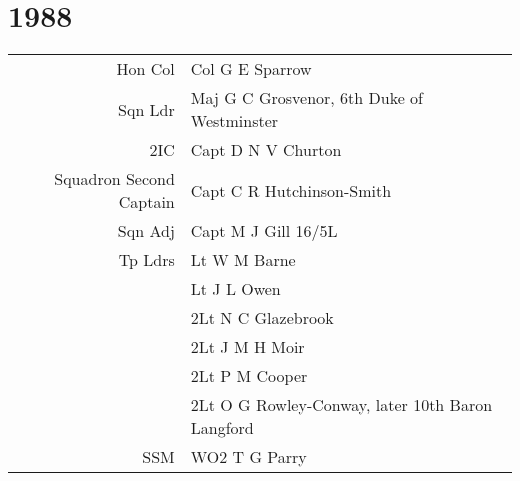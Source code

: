 \chapter*{1988}

\begin{center}
  \small
  \begin{tabular}{rl}
    Hon Col & Col G E Sparrow \\
    Sqn Ldr & Maj G C Grosvenor, 6th Duke of Westminster \\
    2IC & Capt D N V Churton \\
    Squadron Second Captain & Capt C R Hutchinson-Smith \\
    Sqn Adj & Capt M J Gill 16/5L \\
    Tp Ldrs & Lt W M Barne \\
      & Lt J L Owen \\
      & 2Lt N C Glazebrook \\
      & 2Lt J M H Moir \\
      & 2Lt P M Cooper \\
      & 2Lt O G Rowley-Conway, later 10th Baron Langford \\
    SSM & WO2 T G Parry \\
  \end{tabular}
\end{center}

